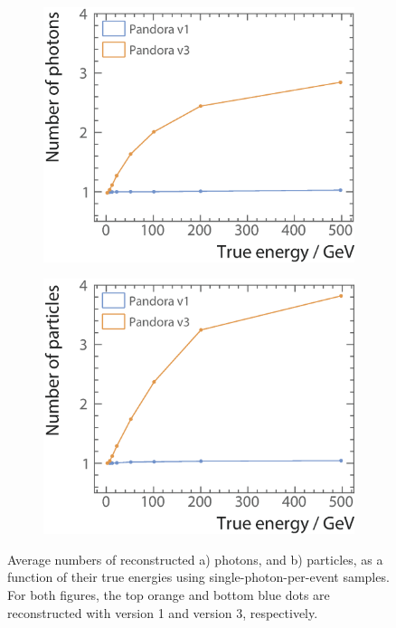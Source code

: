 \begin{figure}[tbph]
\centering
    \begin{subfigure}[b]{0.45\textwidth}
        \includegraphics[width=\textwidth]{photon/SingleN_p2}
        \caption{}
        \label{fig:photonSingleN_p}
    \end{subfigure}
    \begin{subfigure}[b]{0.45\textwidth}
        \includegraphics[width=\textwidth]{photon/SingleN_all2}
        \caption{}
        \label{fig:photonSingleN_all}
    \end{subfigure}
\caption[Average number of reconstructed photons and reconstructed particles, as a function of their true energy using single photon sample.]
{Average numbers of reconstructed a) photons, and b) particles, as a function of their true energies using  single-photon-per-event samples. For both figures, the top orange and bottom blue dots are reconstructed with \pandora version 1 and version 3, respectively.}
\label{fig:photonSingleN}
\end{figure}

